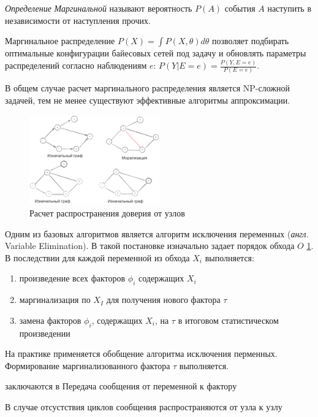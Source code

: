 \textit{Определение} \textit{Маргинальной} называют вероятность $P(A)$ события $A$ 
наступить в независимости от наступления прочих. 

Маргинальное распределение $P(X) = \int P(X, \theta) d\theta$ позволяет
подбирать оптимальные конфигурации байесовых сетей под задачу и обновлять параметры
распределений согласно наблюдениям $e$: $P(Y| E=e) = \frac{P(Y,E=e)}{P(E=e)}$.

В общем случае расчет маргинального распределения является NP-сложной задачей, 
тем не менее существуют эффективные алгоритмы аппроксимации.

\begin{figure}[h]
    \centering
    \includegraphics[width=0.5\textwidth]{assets/math/discrete/elimination.excalidraw.png}
    \caption{Расчет распространения доверия от узлов}
    \label{elimination}
\end{figure}

Одним из базовых алгоритмов является алгоритм исключения переменных (\textit{англ}. Variable Elimination).
В такой постановке изначально задает порядок обхода $O$ \ref{elimination}. В последствии для каждой переменной
из обхода $X_i$ выполняется:\begin{enumerate}
    \item произведение всех факторов $\phi_i$ содержащих $X_i$
    \item маргинализация по $X_I$ для получения нового фактора $\tau$
    \item замена факторов $\phi_i$, содержащих $X_i$, на $\tau$ в итоговом статистическом произведении 
\end{enumerate} 

На практике применяется обобщение алгоритма исключения перменных. Формирование маргинализованного фактора
$\tau$ выполняется.

  заключаются в 
Передача сообщения от переменной к фактору

В случае отсустствия циклов сообщения распространяются от узла к узлу


